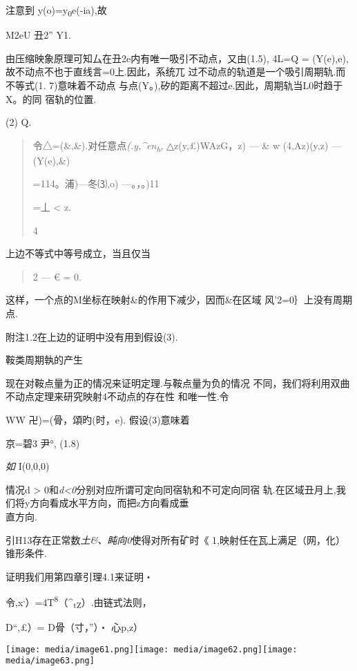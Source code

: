 \documentclass{article}
\begin{document}
注意到 y(o)=y\textsubscript{0}e(-ia),故

M2eU 丑2'' Y1.

由压缩映象原理可知厶在丑2e内有唯一吸引不动点，又由(1.5), 4L=Q =
(Y(e),e),故不动点不也于直线言=0上.因此，系统兀
过不动点的轨道是一个吸引周期轨.而不等式(1. 7)意味着不动点
与点(Y。),矽的距离不超过e.因此，周期轨当L0时趋于X。的同 宿轨的位置.

(2) Q.

\begin{quote}
令△=(\&,\&).对任意点\emph{(.y,\^{}en\textsubscript{h},} △z(y,£)WAzG，z)
--- \& w \textbar{}\textbar{}(4,Az)(y,z) ---
(Y(e),\&)\textbar{}\textbar{}

=114。浦)---冬⑶,o)\textbar{}\textbar{} ---。，。)11

=丄 \textless{} z.

4
\end{quote}

上边不等式中等号成立，当且仅当

\begin{quote}
2 --- € = 0.
\end{quote}

这样，一个点的M坐标在映射\&的作用下减少，因而\&在区域
风'2=0｝上没有周期点.

附注1.2在上边的证明中没有用到假设(3).

鞍类周期執的产生

现在对鞍点量为正的情况来证明定理.与鞍点量为负的情况
不同，我们将利用双曲不动点定理来研究映射4不动点的存在性 和唯一性.令

WW 卍)=(骨，頌旳(时，e). 假设(3)意味着

京=碧3 尹°, (1.8)

\emph{如} I(0,0,0)

情况d \textgreater{}
0和\emph{d\textless{}0}分别对应所谓可定向同宿轨和不可定向同宿
轨.在区域丑月上,我们将y方向看成水平方向，而把z方向看成垂\\
直方向.

引H13存在正常数\emph{土\&、盹向0}使得对所有矿\textbar{}时《
1,映射任在瓦上满足（网，化）锥形条件.

证明我们用第四章引理4.1来证明・

令,x\textsuperscript{,}）=4T\textsuperscript{8}（\^{}\textsubscript{tZ}）.由链式法则，

D``,£）= D骨（寸，''）・ 心p,z）

\texttt{[image: media/image61.png]}\texttt{[image: media/image62.png]}\texttt{[image: media/image63.png]}
\end{document}
